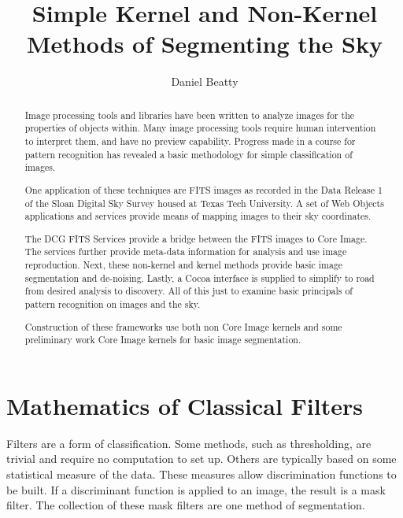 \documentclass[12pt]{report}
\title{Simple Kernel and Non-Kernel Methods of Segmenting the Sky}
\author{Daniel Beatty}
\begin{document}
\maketitle

\begin{abstract}
	Image processing tools and libraries have been written to analyze images for the properties of objects within.  Many image processing tools require human intervention to interpret them, and have no preview capability.  Progress made in a course for pattern recognition has revealed a basic methodology for simple classification of images.  

	One application of these techniques are FITS images as recorded in the Data Release 1 of the Sloan Digital Sky Survey housed at Texas Tech University.  A set of Web Objects applications and services provide means of mapping images to their sky coordinates.   

	The DCG FITS Services provide a bridge between the FITS images to Core Image.  The services further provide meta-data information for analysis and use image reproduction.  Next, these non-kernel and kernel methods provide basic image segmentation and de-noising.  Lastly, a Cocoa interface is supplied to simplify to road from desired analysis to discovery.  All of this just to examine basic principals of pattern recognition on images and the sky.

	Construction of these frameworks use both non Core Image kernels and some preliminary work Core Image kernels for basic image segmentation.
\end{abstract}


\chapter{Mathematics of Classical Filters}

Filters are a form of classification.  Some methods, such as thresholding, are trivial and require no computation to set up.  Others are typically based on some statistical measure of the data.  These measures allow discrimination functions to be built.  If a discriminant function is applied to an image, the result is a mask filter.   The collection of these mask filters are one method of segmentation.  
\end{document}
